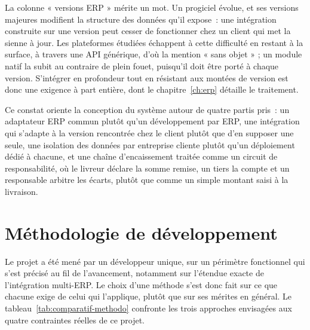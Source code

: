 La colonne « versions ERP » mérite un mot. Un progiciel évolue, et ses versions majeures modifient
la structure des données qu'il expose~: une intégration construite sur une version peut cesser de
fonctionner chez un client qui met la sienne à jour. Les plateformes étudiées échappent à cette
difficulté en restant à la surface, à travers une API générique, d'où la mention « sans objet » ;
un module natif la subit au contraire de plein fouet, puisqu'il doit être porté à chaque version.
S'intégrer en profondeur tout en résistant aux montées de version est donc une exigence à part
entière, dont le chapitre~\ref{ch:erp} détaille le traitement.

Ce constat oriente la conception du système autour de quatre partis pris~: un adaptateur ERP commun
plutôt qu'un développement par ERP, une intégration qui s'adapte à la version rencontrée chez le
client plutôt que d'en supposer une seule, une isolation des données par entreprise cliente plutôt
qu'un déploiement dédié à chacune, et une chaîne d'encaissement traitée comme un circuit de
responsabilité, où le livreur déclare la somme remise, un tiers la compte et un responsable arbitre
les écarts, plutôt que comme un simple montant saisi à la livraison.

\section{Méthodologie de développement}

Le projet a été mené par un développeur unique, sur un périmètre fonctionnel qui s'est précisé au
fil de l'avancement, notamment sur l'étendue exacte de l'intégration multi-ERP. Le choix d'une
méthode s'est donc fait sur ce que chacune exige de celui qui l'applique, plutôt que sur ses mérites
en général. Le tableau~\ref{tab:comparatif-methodo} confronte les trois approches envisagées aux
quatre contraintes réelles de ce projet.

